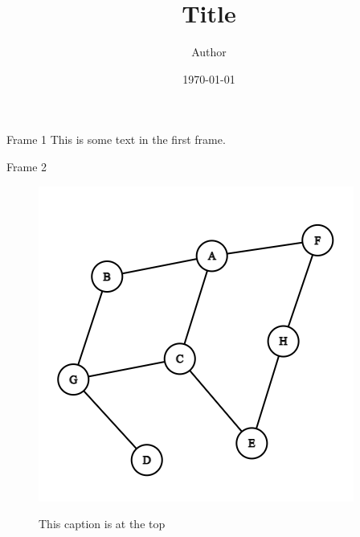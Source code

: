 \documentclass{beamer}
\title{Title}
\author{Author}
\institute{Institute}
\date{\today}
\begin{document}
\frame{\titlepage}

\begin{frame}{Frame 1}
This is some text in the first frame. 
\end{frame}

\begin{frame}{Frame 2}
\begin{figure}[h]
	\centering
	\caption{This caption is at the top}
	\includegraphics[scale=0.4]{graph.png}
	\label{fig:1}
\end{figure}
\end{frame}



\end{document}
